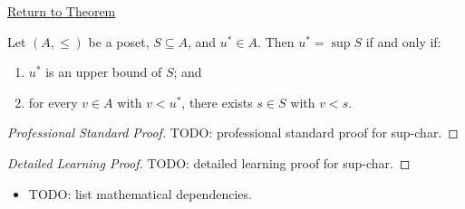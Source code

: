 \newpage
{}
\label{prf:sup-char}

\begin{remark*}[Return]
\hyperref[prop:sup-char]{Return to Theorem}
\end{remark*}

\begin{proposition*}
Let $(A, \leq)$ be a poset, $S \subseteq A$, and $u^* \in A$.  Then
$u^* = \sup S$ if and only if:
\begin{enumerate}[label=(\roman*)]
  \item $u^*$ is an upper bound of $S$; and
  \item for every $v \in A$ with $v < u^*$, there exists $s \in S$ with
        $v < s$.
\end{enumerate}
\end{proposition*}

\begin{proof}[Professional Standard Proof]
\LRAProofBodyStart
TODO: professional standard proof for sup-char.
\end{proof}

\begin{proof}[Detailed Learning Proof]
\LRAProofBodyStart
TODO: detailed learning proof for sup-char.
\end{proof}

\begin{remark*}
\end{remark*}

\begin{dependencies}
\begin{itemize}
  \item TODO: list mathematical dependencies.
\end{itemize}
\end{dependencies}

\clearpage
